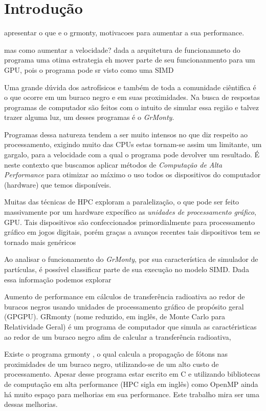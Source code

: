 \chapter{Introdução}
\label{cap:introducao}

apresentar o que e o grmonty, motivacoes para aumentar a sua performance.

mas como aumentar a velocidade? dada a arquitetura de funcionamneto do programa uma otima estrategia eh mover parte de seu funcionanmento para um GPU, pois o programa pode sr visto como uma SIMD

Uma grande dúvida dos astrofísicos e também de toda a comunidade ciêntifica é o que ocorre em um buraco negro e em suas proximidades. Na busca de respostas programas de computador são feitos com o intuito de simular essa região e talvez trazer alguma luz, um desses programas é o \emph{GrMonty}.

Programas dessa natureza tendem a ser muito intensos no que diz respeito ao processamento, exigindo muito das CPUs estas tornam-se assim um limitante, um gargalo, para a velocidade com a qual o programa pode devolver um resultado. É neste contexto que buscamos aplicar métodos de \emph{Computação de Alta Performance} para otimizar ao máximo o uso todos os dispositivos do computador (hardware) que temos disponíveis.

Muitas das técnicas de HPC exploram a paralelização, o que pode ser feito massivamente por um hardware expecífico as \emph{unidades de processamento gráfico}, GPU. Tais dispositivos são confeccionados primordialmente para processamento gráfico em jogos digitais, porém graças a avanços recentes tais dispositivos tem se tornado mais genéricos

Ao analisar o funcionamento do \emph{GrMonty}, por sua característica de simulador de partículas, é possível classificar parte de sua execução no modelo SIMD. Dada essa informação podemos explorar


Aumento de performance em cálculos de transferência radioativa ao redor de
buracos negros usando unidades de processamento gráfico de propósito geral
(GPGPU).
GRmonty (nome reduzido, em inglês, de Monte Carlo para Relatividade Geral) é um programa de computador que simula as caractéristicas ao redor de um buraco negro afim de calcular a transferência radioativa,


Existe o programa grmonty \citep{Dolence:09},
o qual calcula a propagação de fótons nas proximidades de um buraco negro,
utilizando-se de um alto custo de processamento. Apesar desse programa estar
escrito em C e utilizando bibliotecas de computação em alta performance
(HPC sigla em inglês) como OpenMP ainda há muito espaço para melhorias em sua
performance. Este trabalho mira ser uma dessas melhorias.

